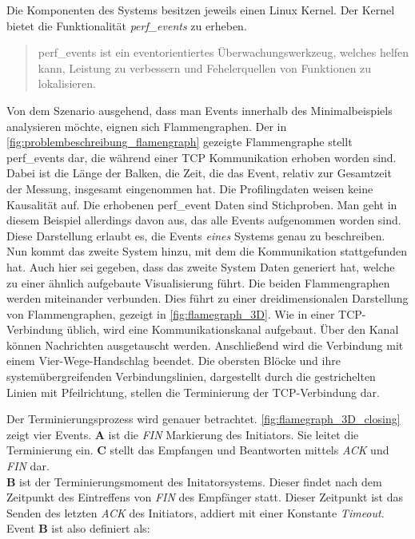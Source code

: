 Die Komponenten des Systems besitzen jeweils einen Linux Kernel. Der Kernel bietet die Funktionalität \emph{perf\_events} zu erheben. 
\begin{quote}
	\cbstart
	perf\_events ist ein eventorientiertes Überwachungswerkzeug, welches helfen kann, Leistung zu verbessern und Fehelerquellen von Funktionen zu lokalisieren. 
	\cbend
\end{quote}
Von dem Szenario ausgehend, dass man Events innerhalb des Minimalbeispiels analysieren möchte, eignen sich Flammengraphen.
 Der in \cref{fig:problembeschreibung_flamengraph} gezeigte Flammengraphe stellt perf\_events dar, die während einer TCP Kommunikation erhoben worden sind.  Dabei ist die Länge der Balken, die Zeit, die das Event, relativ zur Gesamtzeit der Messung, insgesamt eingenommen hat. Die Profilingdaten weisen keine Kausalität auf. Die erhobenen perf\_event Daten sind Stichproben. Man geht in diesem Beispiel allerdings davon aus, das alle Events aufgenommen worden sind. Diese Darstellung erlaubt es, die Events \emph{eines} Systems genau zu beschreiben. Nun kommt das zweite System hinzu, mit dem die Kommunikation stattgefunden hat. Auch hier sei gegeben, dass das zweite System Daten generiert hat, welche zu einer ähnlich aufgebaute Visualisierung führt. Die beiden Flammengraphen werden miteinander verbunden. Dies führt zu einer dreidimensionalen Darstellung von Flammengraphen, gezeigt in \cref{fig:flamegraph_3D}. Wie in einer TCP-Verbindung üblich, wird eine Kommunikationskanal aufgebaut. Über den Kanal können Nachrichten ausgetauscht werden. Anschließend wird die Verbindung mit einem Vier-Wege-Handschlag beendet. Die obersten Blöcke und ihre systemübergreifenden Verbindungslinien, dargestellt durch die gestrichelten Linien mit Pfeilrichtung, stellen die Terminierung der TCP-Verbindung dar.
 
 Der Terminierungsprozess wird genauer betrachtet. \cref{fig:flamegraph_3D_closing} zeigt vier Events. \textbf{A} ist die \emph{FIN} Markierung des Initiators. Sie leitet die Terminierung ein. \textbf{C} stellt das Empfangen und Beantworten mittels \emph{ACK} und \emph{FIN} dar. \\
 \textbf{B} ist der Terminierungsmoment des Initatorsystems. Dieser findet nach dem Zeitpunkt des Eintreffens von \emph{FIN} des Empfänger statt. Dieser Zeitpunkt ist das Senden des letzten \emph{ACK} des Initiators, addiert mit einer Konstante \emph{Timeout}.  Event \textbf{B} ist also definiert als:
 
